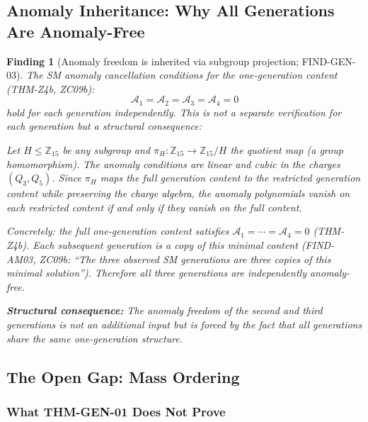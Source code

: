 \documentclass[12pt, a4paper]{article}
\newtheorem{finding}{Finding}[section]
\begin{document}
\subsection{Anomaly Inheritance: Why All Generations Are
  Anomaly-Free}
\label{zc15:sec:anomaly}

\begin{finding}[Anomaly freedom is inherited via subgroup
  projection; FIND-GEN-03]
\label{zc15:find:anomaly-inherit}
The SM anomaly cancellation conditions for the one-generation
content (THM-Z4b, ZC09b):
\[
  \mathcal{A}_1 = \mathcal{A}_2 = \mathcal{A}_3 = \mathcal{A}_4 = 0
\]
hold for each generation independently. This is not a separate
verification for each generation but a structural consequence:

Let $H \leq \mathbb{Z}_{15}$ be any subgroup and $\pi_H:
\mathbb{Z}_{15} \to \mathbb{Z}_{15}/H$ the quotient map (a group
homomorphism). The anomaly conditions are linear and cubic in the
charges $(Q_3, Q_5)$. Since $\pi_H$ maps the full generation
content to the restricted generation content while preserving
the charge algebra, the anomaly polynomials vanish on each
restricted content if and only if they vanish on the full content.

Concretely: the full one-generation content satisfies
$\mathcal{A}_1 = \cdots = \mathcal{A}_4 = 0$ (THM-Z4b). Each
subsequent generation is a \emph{copy} of this minimal content
(FIND-AM03, ZC09b: ``The three observed SM generations are three
copies of this minimal solution''). Therefore all three generations
are independently anomaly-free.

\textbf{Structural consequence:} The anomaly freedom of the
second and third generations is not an additional input but is
forced by the fact that all generations share the same
one-generation structure.
\end{finding}

\subsection{The Open Gap: Mass Ordering}
\label{zc15:sec:gap}

\subsubsection{What THM-GEN-01 Does Not Prove}
\end{document}
